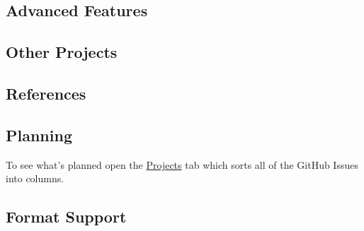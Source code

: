 \hypertarget{advanced-features-1}{%
\subsection{Advanced Features}\label{advanced-features-1}}

\hypertarget{other-projects-1}{%
\subsection{Other Projects}\label{other-projects-1}}

\hypertarget{references-1}{%
\subsection{References}\label{references-1}}

\hypertarget{planning}{%
\subsection{Planning}\label{planning}}

To see what's planned open the
\href{https://github.com/Embroidermodder/Embroidermodder/projects/1}{Projects}
tab which sorts all of the GitHub Issues into columns.

\hypertarget{format-support}{%
\subsection{Format Support}\label{format-support}}

